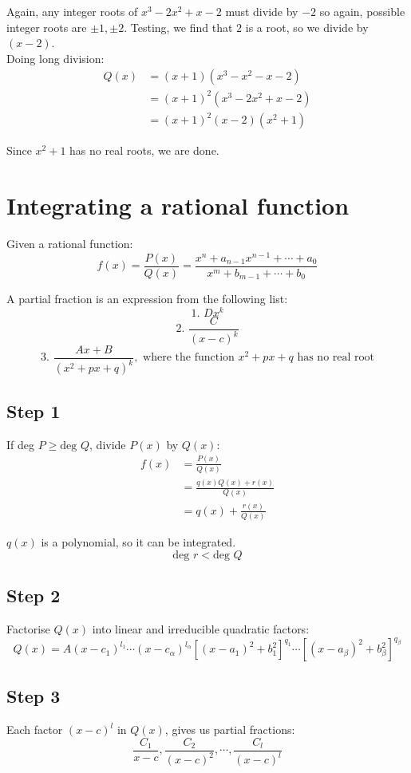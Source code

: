 \documentclass[11pt]{article}
\begin{document}
Again, any integer roots of \(x^3 - 2x^2 + x - 2\) must divide by \(-2\) so again, possible integer roots are \(\pm 1, \pm 2\). Testing, we find that \(2\) is a root, so we divide by \((x - 2)\).
\\[0pt]

Doing long division:
\begin{align*}
Q(x) &= (x + 1)(x^3 - x^2 - x - 2) \\
&= (x + 1)^2 (x^3 - 2x^2 + x - 2) \\
&= (x + 1)^2 (x - 2) (x^2 + 1)
\end{align*}

Since \(x^2 + 1\) has no real roots, we are done.


\section{Integrating a rational function}
\label{sec:org55d1c89}
Given a rational function:
\[f(x) = \frac{P(x)}{Q(x)} = \frac{x^n + a_{n - 1} x^{n - 1} + \cdots + a_0}{x^m + b_{m - 1} + \cdots + b_0}\]

A partial fraction is an expression from the following list:
\[\text{1. } Dx^k\]
\[\text{2. } \frac{C}{(x - c)^k}\]
\[\text{3. } \frac{Ax + B}{(x^2 + px + q)^k}, \text{ where the function } x^2 + px + q \text{ has no real root}\]

\subsection{Step 1}
\label{sec:orge7d65a0}
If deg \(P \ge \text{deg } Q\), divide \(P(x)\) by \(Q(x)\):
\begin{align*}
f(x) &= \frac{P(x)}{Q(x)} \\
&= \frac{q(x)Q(x) + r(x)}{Q(x)} \\
&= q(x) + \frac{r(x)}{Q(x)}
\end{align*}

\(q(x)\) is a polynomial, so it can be integrated.
\[\text{deg } r < \text{deg } Q\]

\subsection{Step 2}
\label{sec:orgfbd6f8c}
Factorise \(Q(x)\) into linear and irreducible quadratic factors:
\[Q(x) = A(x - c_1)^{l_1} \cdots (x - c_\alpha)^{l_\alpha}[(x - a_1)^2 + b_1^2]^{q_1} \cdots [(x - a_\beta)^2 + b_\beta^2]^{q_\beta}\]

\subsection{Step 3}
\label{sec:orge964a8e}
Each factor \((x - c)^l\) in \(Q(x)\), gives us partial fractions:
\[\frac{C_1}{x - c}, \frac{C_2}{(x - c)^2}, \cdots, \frac{C_l}{(x - c)^l}\]
\end{document}
